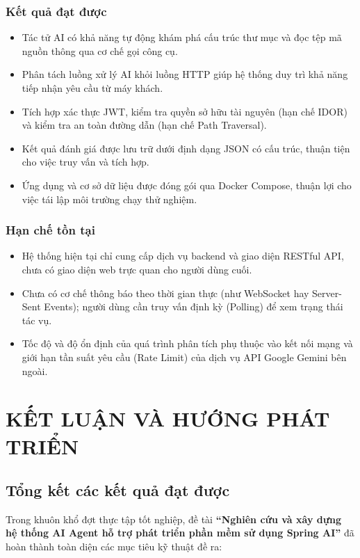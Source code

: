 \documentclass[12pt,a4paper]{report}
\begin{document}
\subsection{Kết quả đạt được}
\begin{itemize}
    \item Tác tử AI có khả năng tự động khám phá cấu trúc thư mục và đọc tệp mã nguồn thông qua cơ chế gọi công cụ.
    \item Phân tách luồng xử lý AI khỏi luồng HTTP giúp hệ thống duy trì khả năng tiếp nhận yêu cầu từ máy khách.
    \item Tích hợp xác thực JWT, kiểm tra quyền sở hữu tài nguyên (hạn chế IDOR) và kiểm tra an toàn đường dẫn (hạn chế Path Traversal).
    \item Kết quả đánh giá được lưu trữ dưới định dạng JSON có cấu trúc, thuận tiện cho việc truy vấn và tích hợp.
    \item Ứng dụng và cơ sở dữ liệu được đóng gói qua Docker Compose, thuận lợi cho việc tái lập môi trường chạy thử nghiệm.
\end{itemize}

\subsection{Hạn chế tồn tại}
\begin{itemize}
    \item Hệ thống hiện tại chỉ cung cấp dịch vụ backend và giao diện RESTful API, chưa có giao diện web trực quan cho người dùng cuối.
    \item Chưa có cơ chế thông báo theo thời gian thực (như WebSocket hay Server-Sent Events); người dùng cần truy vấn định kỳ (Polling) để xem trạng thái tác vụ.
    \item Tốc độ và độ ổn định của quá trình phân tích phụ thuộc vào kết nối mạng và giới hạn tần suất yêu cầu (Rate Limit) của dịch vụ API Google Gemini bên ngoài.
\end{itemize}

\chapter{KẾT LUẬN VÀ HƯỚNG PHÁT TRIỂN}

\section{Tổng kết các kết quả đạt được}
Trong khuôn khổ đợt thực tập tốt nghiệp, đề tài \textbf{``Nghiên cứu và xây dựng hệ thống AI Agent hỗ trợ phát triển phần mềm sử dụng Spring AI''} đã hoàn thành toàn diện các mục tiêu kỹ thuật đề ra:
\end{document}
